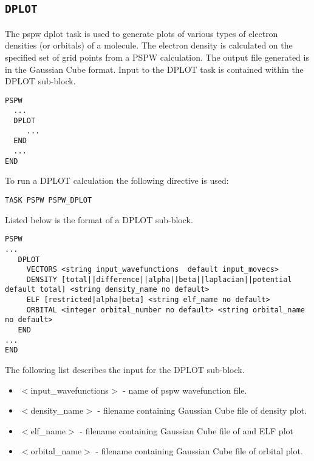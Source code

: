 \subsection{\tt DPLOT}
\label{sec:pspw_dplot}
The pspw dplot task is used to generate plots of various types of electron
densities (or orbitals) of a molecule.  The electron density is calculated on the 
specified set of grid points from a PSPW calculation.  The output file
generated is in the Gaussian Cube format.
Input to the DPLOT task is contained
within the DPLOT sub-block.
\begin{verbatim}
PSPW
  ...
  DPLOT
     ...
  END
  ...
END
\end{verbatim}
To run a DPLOT calculation the following directive 
is used:
\begin{verbatim}
TASK PSPW PSPW_DPLOT
\end{verbatim}
Listed below is the format of a DPLOT sub-block.
\begin{verbatim}
PSPW
... 
   DPLOT
     VECTORS <string input_wavefunctions  default input_movecs>  
     DENSITY [total||difference||alpha||beta||laplacian||potential default total] <string density_name no default>
     ELF [restricted|alpha|beta] <string elf_name no default>
     ORBITAL <integer orbital_number no default> <string orbital_name no default>
   END
...
END
\end{verbatim}
The following list describes the input for the DPLOT
sub-block.
\begin{itemize}
        \item $<$input\_wavefunctions$>$ - name of pspw wavefunction file.
        \item $<$density\_name$>$ - filename containing Gaussian Cube file of
                                    density plot.
        \item $<$elf\_name$>$ - filename containing Gaussian Cube file of and
                                ELF plot 
        \item $<$orbital\_name$>$ - filename containing Gaussian Cube file of 
                                    orbital plot.
\end{itemize}

